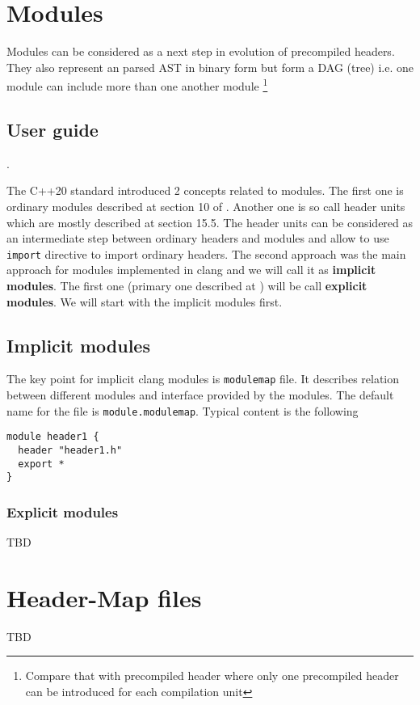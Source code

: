 \section{Modules}
Modules can be considered as a next step in evolution of precompiled
headers. They also represent an parsed AST in binary form but form a
DAG (tree) i.e. one module can include more than one another module
\footnote{Compare that with precompiled header where only one
precompiled header can be introduced for each compilation unit}
\subsection{User guide}.

The C++20 standard \cite{book:ieee_cpp_20} introduced 2 concepts
related to modules. The first one is ordinary modules described at
section 10 of \cite{book:ieee_cpp_20}. Another one is so call header
units   which are mostly described at section 15.5.
The header units can be considered as an intermediate step between
ordinary headers and modules and allow to use
\texttt{import} directive to import ordinary headers. The
second approach was the main approach for modules implemented in clang
and we will call it as \textbf{implicit modules}. The first one (primary one
described at \cite{book:ieee_cpp_20}) will be call \textbf{explicit
  modules}. We will start with the implicit modules first.

\subsection{Implicit modules}
The key point for implicit clang modules is \texttt{modulemap}
file. It describes relation between different modules and interface
provided by the modules. The default name for the file is
\texttt{module.modulemap}. Typical content is the following
\begin{verbatim}
module header1 {
  header "header1.h"
  export *
}
\end{verbatim}

\subsubsection{Explicit modules}
TBD

\section{Header-Map files}
TBD
